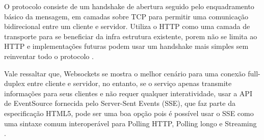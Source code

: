 O protocolo consiste de um handshake de abertura seguido pelo enquadramento básico da mensagem, em camadas sobre TCP para permitir uma comunicação bidirecional entre um cliente e servidor. Utiliza o HTTP como uma camada de transporte para se beneficiar da infra estrutura existente, porem não se limita ao HTTP e implementações futuras podem usar um handshake mais simples sem reinventar todo o protocolo \citep{Saint-Andre2011}.

Vale ressaltar que, Websockets se mostra o melhor cenário para uma conexão full-duplex entre cliente e servidor, no entanto, se o serviço apenas transmite informações para seus clientes e não requer qualquer interatividade, usar a API de EventSource fornecida pelo Server-Sent Events (SSE), que faz parte da especificação HTML5, pode ser uma boa opção pois é possível usar o SSE como uma sintaxe comum interoperável para Polling HTTP, Polling longo e Streaming \citep[p.~10-11]{Wang2013}.